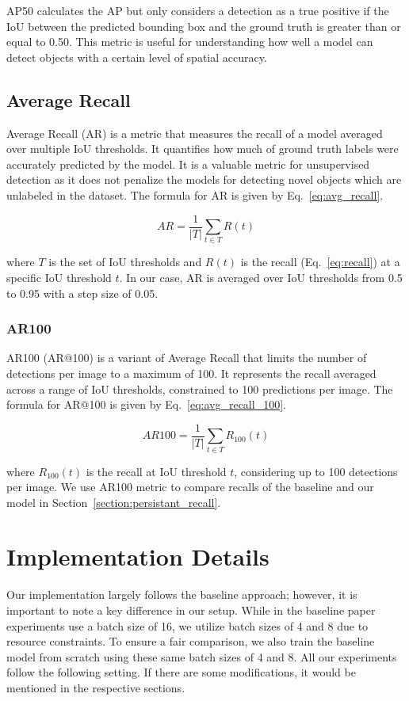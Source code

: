 AP50 calculates the AP but only considers a detection as a true positive if the IoU between the predicted bounding box and the ground truth is greater than or equal to 0.50. This metric is useful for understanding how well a model can detect objects with a certain level of spatial accuracy.

\subsection{Average Recall}
Average Recall (AR) is a metric that measures the recall of a model averaged over multiple IoU thresholds. It quantifies how much of ground truth labels were accurately predicted by the model. It is a valuable metric for unsupervised detection as it does not penalize the models for detecting novel objects which are unlabeled in the dataset. The formula for AR is given by Eq.~\ref{eq:avg_recall}.

\begin{equation}
	\label{eq:avg_recall}
	AR = \frac{1}{|T|} \sum_{t \in T} R(t)
\end{equation}


where \( T \) is the set of IoU thresholds and \( R(t) \) is the recall (Eq.~\ref{eq:recall}) at a specific IoU threshold \( t \). In our case, AR is averaged over IoU thresholds from 0.5 to 0.95 with a step size of 0.05. 

\subsubsection{AR100}
AR100 (AR@100) is a variant of Average Recall that limits the number of detections per image to a maximum of 100. It represents the recall averaged across a range of IoU thresholds, constrained to 100 predictions per image. The formula for AR@100 is given by Eq.~\ref{eq:avg_recall_100}.

\begin{equation}
	\label{eq:avg_recall_100}
	AR100 = \frac{1}{|T|} \sum_{t \in T} R_{100}(t)
\end{equation}

where \( R_{100}(t) \) is the recall at IoU threshold \( t \), considering up to 100 detections per image. We use AR100 metric to compare recalls of the baseline and our model in Section~\ref{section:persistant_recall}.

\section{Implementation Details}
\label{section:implementation_details}
Our implementation largely follows the baseline approach; however, it is important to note a key difference in our setup. While in the baseline paper experiments use a batch size of 16, we utilize batch sizes of 4 and 8 due to resource constraints. To ensure a fair comparison, we also train the baseline model from scratch using these same batch sizes of 4 and 8. All our experiments follow the following setting. If there are some modifications, it would be mentioned in the respective sections.


